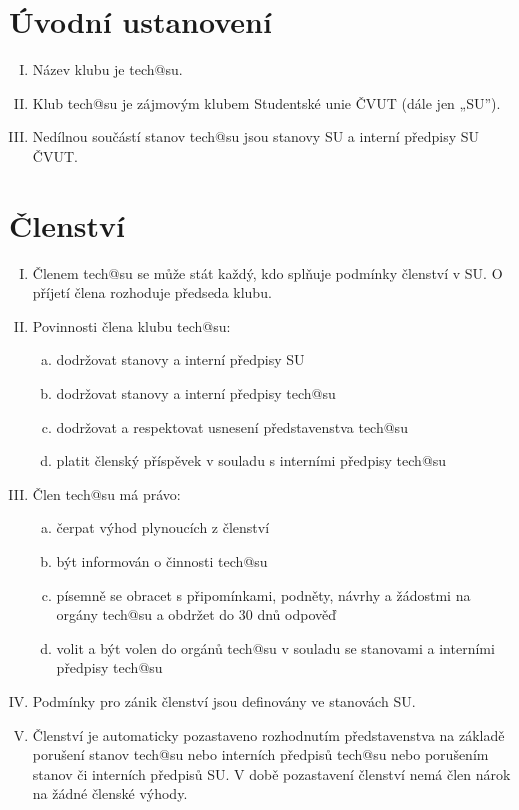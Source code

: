 \documentclass[10pt]{article}
\begin{document}
\section{Úvodní ustanovení} %
	\begin{enumerate}[I.]
	\item Název klubu je tech@su.
	\item Klub tech@su je zájmovým klubem Studentské unie ČVUT (dále jen „SU”).  
	\item Nedílnou součástí stanov tech@su jsou stanovy SU a interní předpisy SU ČVUT.
	\end{enumerate}

\section{Členství} %
	\begin{enumerate}[I.]
	\item Členem tech@su se může stát každý, kdo splňuje podmínky členství v SU. O příjetí člena rozhoduje předseda klubu.
	\item Povinnosti člena klubu tech@su: 
		\begin{enumerate}[a.]
		\item dodržovat stanovy a interní předpisy SU
		\item dodržovat stanovy a interní předpisy tech@su
		\item dodržovat a respektovat usnesení představenstva tech@su
		\item platit členský příspěvek v souladu s interními předpisy tech@su
		\end{enumerate}
	\item Člen tech@su má právo:
		\begin{enumerate}[a.]
		\item čerpat výhod plynoucích z členství
		\item být informován o činnosti tech@su 
		\item písemně se obracet s připomínkami, podněty, návrhy a žádostmi na orgány tech@su a obdržet do 30 dnů odpověď
		\item volit a být volen do orgánů tech@su v souladu se stanovami a interními předpisy tech@su
		\end{enumerate}
	\item Podmínky pro zánik členství jsou definovány ve stanovách SU.  
	\item Členství je automaticky pozastaveno rozhodnutím představenstva na základě porušení stanov tech@su nebo interních předpisů tech@su nebo porušením stanov či interních předpisů SU. V době pozastavení členství nemá člen nárok na žádné členské výhody.     
	\end{enumerate}
\end{document}
